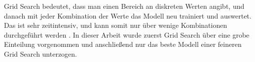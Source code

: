 Grid Search bedeutet, dass man einen Bereich an diskreten Werten angibt, und danach mit jeder Kombination der Werte das Modell neu trainiert und auswertet.
Das ist sehr zeitintensiv, und kann somit nur \"uber wenige Kombinationen durchgef\"uhrt werden \cite[Seiten 76 bis 78]{handson}. In dieser Arbeit wurde zuerst Grid Search \"uber eine grobe Einteilung
vorgenommen und anschlie{\ss}end nur das beste Modell einer feineren Grid Search unterzogen.




